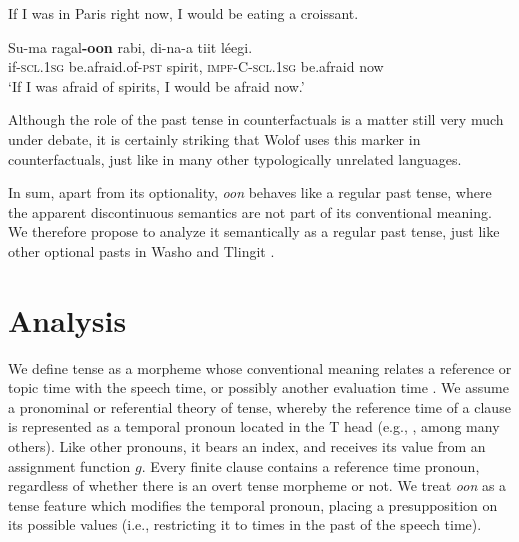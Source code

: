 \documentclass[output=paper,newtxmath,modfonts,nonflat,draftmode]{langsci/langscibook}
\begin{document}
\ea\label{ex:bochnak:paris} 
If I was in Paris right now, I would be eating a croissant. 
\z

\ea\label{ex:bochnak:counterfact}
\gll Su-ma ragal\textbf{-oon} rabi, di-na-a tiit l\'eegi.\\
if-\textsc{scl.1sg} be.afraid.of-\textsc{pst} spirit,
\textsc{impf-C-scl.1sg} be.afraid now\\
\glt `If I was afraid of spirits, I would be afraid now.'
\z

Although the role of the past tense in counterfactuals is a matter still very much under debate, it is certainly striking that Wolof uses this marker in counterfactuals, just like in many other typologically unrelated languages.

In sum, apart from its optionality, \textit{oon} behaves like a regular past tense, where the apparent discontinuous semantics are not part of its conventional meaning. We therefore propose to analyze it semantically as a regular past tense, just like other optional pasts in Washo \citep{bochnak16past} and Tlingit \citep{Cable2017a}.




\section{Analysis}\label{sec:bochnak:4}

We define tense as a morpheme whose conventional meaning relates a reference or topic time with the speech time, or possibly another evaluation time \citep{reichenbach47tenses, klein94time}. We assume a pronominal or referential theory of tense, whereby the reference time of a clause is represented as a temporal pronoun located in the T head (e.g., \citealt{abusch97sequence, heim94comments, partee73some}, among many others). Like other pronouns, it bears an index, and receives its value from an assignment function $g$. Every finite clause contains a reference time pronoun, regardless of whether there is an overt tense morpheme or not. We treat \textit{oon} as a tense feature which modifies the temporal pronoun, placing a presupposition on its possible values (i.e., restricting it to times in the past of the speech time).
\end{document}
